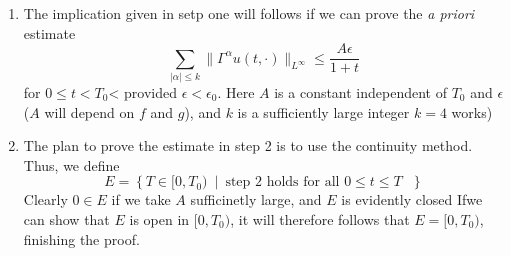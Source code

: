 \documentclass{book}
\newenvironment{Proof}[1][]
  {\begin{ProofTcb}[#1]}
  {\end{ProofTcb}}
\newcommand{\Rw}{\Rightarrow}
\newcommand{\set}[2]{\left\{#1 \ \middle|\ #2\right\}}
\begin{document}
\begin{Proof}
\begin{enumerate}
			solves equation~(\ref{eq:lowDimEq1}) and the cauchy data (setting $R^I = 0$ for simplicity). We
			shall prove the existence of $\epsilon_0 > 0$< independnet of $T_0$ such that
			\[
				0 < \epsilon < \epsilon_0 \Rw u, \partial u \in L^\infty(S_{T_0})
			\]
			Once we know this, it follows from local existence that we've done in previous section that the
			lifespan $T_\epsilon = \infty$
		\item The implication given in setp one will follows if we can prove the \emph{a priori} estimate
			\begin{equation}\label{eq:lowDimEq4}
			  \sum_{|\alpha| \le k} \|\Gamma^\alpha u(t, \cdot)\|_{L^\infty} \le \frac{A\epsilon}{1+t}
			\end{equation}
			for $0 \le t < T_0$< provided $\epsilon < \epsilon_0$. Here $A$ is a constant
			independent of $T_0$ and $\epsilon$ ($A$ will depend on $f$ and $g$), and $k$ is a sufficiently
			large integer $k = 4$ works)
		\item The plan to prove the estimate in step 2 is to use the continuity method. Thus, we define
			\[
				E = \set{T \in [0, T_0)}{ \text{step 2 holds for all $0 \le t \le T$ }}
				\]
				Clearly $0 \in E$ if we take $A$ sufficinetly large, and $E$ is evidently closed Ifwe
				can show that $E$ is open in $[0, T_0)$, it will therefore follows that $E = [0, T_0)$,
				finishing the proof.


\end{enumerate}
\end{Proof}
\end{document}
